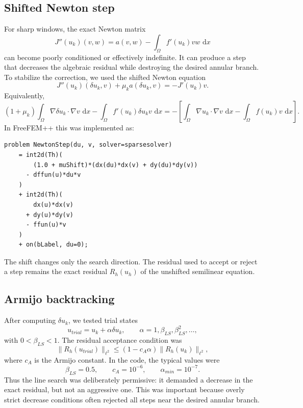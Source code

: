 \documentclass[11pt,a4paper]{article}
\newcommand{\Om}{\Omega}
\newcommand{\dd}{\,\mathrm{d}}
\begin{document}
\subsection{Shifted Newton step}

For sharp windows, the exact Newton matrix
\begin{equation}
  J''(u_k)(v,w)=a(v,w)-\int_\Om f'(u_k)vw\,\dd x
\end{equation}
can become poorly conditioned or effectively indefinite. It can produce a step
that decreases the algebraic residual while destroying the desired annular
branch. To stabilize the correction, we used the shifted Newton equation
\begin{equation}
  J''(u_k)(\delta u_k,v)+\mu_k a(\delta u_k,v)=-J'(u_k)v.
\end{equation}
Equivalently,
\begin{equation}
  (1+
  \mu_k)\int_\Om \nabla\delta u_k\cdot\nabla v\,\dd x
  -\int_\Om f'(u_k)\delta u_k v\,\dd x
  =-
  \left[
  \int_\Om\nabla u_k\cdot\nabla v\,\dd x
  -\int_\Om f(u_k)v\,\dd x
  \right].
\end{equation}
In FreeFEM++ this was implemented as:
\begin{lstlisting}[style=ff]
problem NewtonStep(du, v, solver=sparsesolver)
    = int2d(Th)(
        (1.0 + muShift)*(dx(du)*dx(v) + dy(du)*dy(v))
      - dffun(u)*du*v
    )
    + int2d(Th)(
        dx(u)*dx(v)
      + dy(u)*dy(v)
      - ffun(u)*v
    )
    + on(bLabel, du=0);
\end{lstlisting}
The shift changes only the search direction. The residual used to accept or
reject a step remains the exact residual $R_h(u_h)$ of the unshifted semilinear
equation.

\subsection{Armijo backtracking}

After computing $\delta u_k$, we tested trial states
\begin{equation}
  u_{trial}=u_k+\alpha\delta u_k,
  \qquad
  \alpha=1,\beta_{LS},\beta_{LS}^2,\ldots,
\end{equation}
with $0<\beta_{LS}<1$. The residual acceptance condition was
\begin{equation}
  \|R_h(u_{trial})\|_{\ell^2}
  \leq
  (1-c_{A}\alpha)\|R_h(u_k)\|_{\ell^2},
\end{equation}
where $c_A$ is the Armijo constant. In the code, the typical values were
\begin{equation}
  \beta_{LS}=0.5,
  \qquad
  c_A=10^{-6},
  \qquad
  \alpha_{min}=10^{-7}.
\end{equation}
Thus the line search was deliberately permissive: it demanded a decrease in the
exact residual, but not an aggressive one. This was important because overly
strict decrease conditions often rejected all steps near the desired annular
branch.
\end{document}
